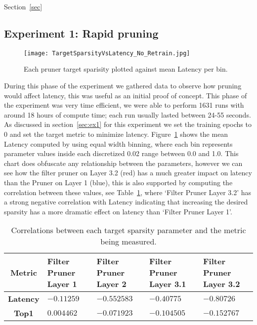\documentclass[../Dissertation.tex]{subfiles}
\begin{document}
Section~\ref{sec}

\subsection{Experiment 1: Rapid pruning}\label{sec:FastPruningPhase}

\begin{figure}[H]
    \texttt{[image: TargetSparsityVsLatency\_No\_Retrain.jpg]}
    \caption{Each pruner target sparisity plotted against mean Latency per bin.}
    \label{fig:fastPruneParamVSLatency}
\end{figure}

During this phase of the experiment we gathered data to observe how pruning would affect latency, this was useful as an initial proof of concept.
This phase of the experiment was very time efficient, we were able to perform 1631 runs with around 18 hours of compute time; each run usually lasted between 24-55 seconds. 
As discussed in section~\ref{sec:ex1} for this experiment we set the training epochs to 0 and set the target metric to minimize latency. 
Figure~\ref{fig:fastPruneParamVSLatency} shows the mean Latency computed by using equal width binning, where each bin represents parameter values inside each discretized 0.02 range between 0.0 and 1.0.
This chart does obfuscate any relationship between the parameters, however we can see how the filter pruner on Layer 3.2 (red) has a much greater impact on latency than the Pruner on Layer 1 (blue), this is also supported by computing the correlation between these values, see Table~\ref{tab:fastPruneCorrelations}, where `Filter Pruner Layer 3.2' has a strong negative correlation with Latency indicating that increasing the desired sparsity has a more dramatic effect on latency than `Filter Pruner Layer 1'.

\singlespacing
\begin{table}[H]
    \centering
    \begin{tabular}{@{}cp{26mm}p{26mm}p{26mm}p{26mm}@{}}
    \toprule
    \textbf{Metric}  & \textbf{Filter Pruner  Layer 1} & \textbf{Filter Pruner Layer 2} & \textbf{Filter Pruner Layer 3.1} & \textbf{Filter Pruner Layer 3.2} \\ \midrule
    \textbf{Latency} & $-0.11259$                        & $-0.552583$                      & $-0.40775$                         & $-0.80726$                         \\
    \textbf{Top1}    & $0.004462$                        & $-0.071923$                      & $-0.104505$                        & $-0.152767$                        \\ \bottomrule
    \end{tabular}
    \caption{Correlations between each target sparsity parameter and the metric being measured.}
    \label{tab:fastPruneCorrelations}
\end{table}
\doublespacing
\end{document}
